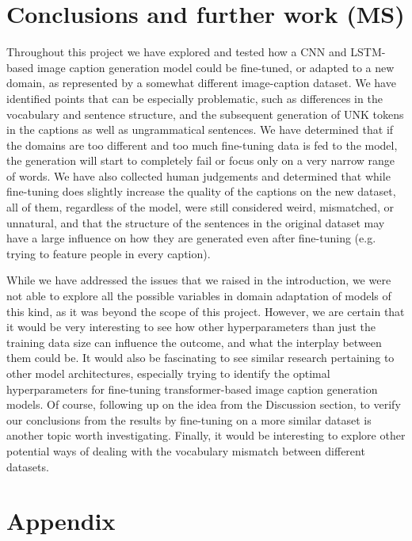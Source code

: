 \documentclass[11pt]{article}
\begin{document}
\section{Conclusions and further work (MS)}

Throughout this project we have explored and tested how a CNN and LSTM-based image caption generation model could be fine-tuned, or adapted to a new domain, as represented by a somewhat different image-caption dataset. We have identified points that can be especially problematic, such as differences in the vocabulary and sentence structure, and the subsequent generation of UNK tokens in the captions as well as ungrammatical sentences. We have determined that if the domains are too different and too much fine-tuning data is fed to the model, the generation will start to completely fail or focus only on a very narrow range of words. We have also collected human judgements and determined that while fine-tuning does slightly increase the quality of the captions on the new dataset, all of them, regardless of the model, were still considered weird, mismatched, or unnatural, and that the structure of the sentences in the original dataset may have a large influence on how they are generated even after fine-tuning (e.g. trying to feature people in every caption).

While we have addressed the issues that we raised in the introduction, we were not able to explore all the possible variables in domain adaptation of models of this kind, as it was beyond the scope of this project. However, we are certain that it would be very interesting to see how other hyperparameters than just the training data size can influence the outcome, and what the interplay between them could be. It would also be fascinating to see similar research pertaining to other model architectures, especially trying to identify the optimal hyperparameters for fine-tuning transformer-based image caption generation models. Of course, following up on the idea from the Discussion section, to verify our conclusions from the results by fine-tuning on a more similar dataset is another topic worth investigating. Finally, it would be interesting to explore other potential ways of dealing with the vocabulary mismatch between different datasets.



\appendix

\section{Appendix}
\label{sec:appendix}
\end{document}
